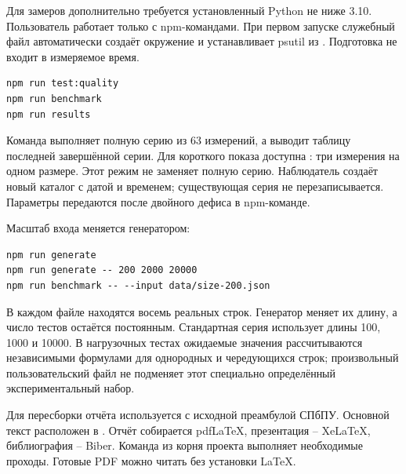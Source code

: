 Для замеров дополнительно требуется установленный Python не ниже 3.10. Пользователь работает только с npm-командами. При первом запуске служебный файл  автоматически создаёт окружение и устанавливает psutil из . Подготовка не входит в измеряемое время.
\begin{lstlisting}
npm run test:quality
npm run benchmark
npm run results
\end{lstlisting}
Команда  выполняет полную серию из 63 измерений, а  выводит таблицу последней завершённой серии. Для короткого показа доступна : три измерения на одном размере. Этот режим не заменяет полную серию. Наблюдатель создаёт новый каталог с датой и временем; существующая серия не перезаписывается. Параметры передаются после двойного дефиса в npm-команде.

Масштаб входа меняется генератором:
\begin{lstlisting}
npm run generate
npm run generate -- 200 2000 20000
npm run benchmark -- --input data/size-200.json
\end{lstlisting}
В каждом файле находятся восемь реальных строк. Генератор меняет их длину, а число тестов остаётся постоянным. Стандартная серия использует длины 100, 1000 и 10000. В нагрузочных тестах ожидаемые значения рассчитываются независимыми формулами для однородных и чередующихся строк; произвольный пользовательский файл не подменяет этот специально определённый экспериментальный набор.

Для пересборки отчёта используется  с исходной преамбулой СПбПУ. Основной текст расположен в . Отчёт собирается pdfLaTeX, презентация -- XeLaTeX, библиография -- Biber. Команда  из корня проекта выполняет необходимые проходы. Готовые PDF можно читать без установки LaTeX.

